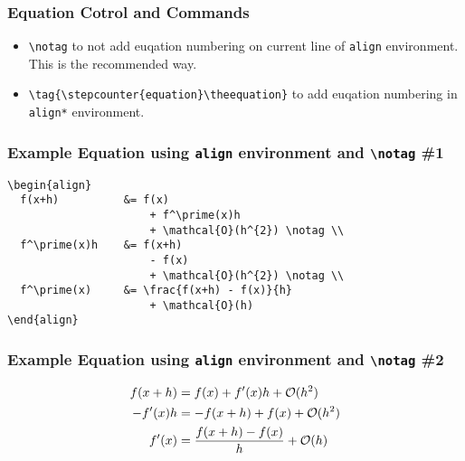 \documentclass{beamer}
\begin{document}
\begin{frame}[fragile]
  \frametitle{Equation Cotrol and Commands}
  \begin{itemize}
    \item \verb|\notag| to not add euqation numbering on current line of \texttt{align} environment. This is the recommended way.
    \item \verb|\tag{\stepcounter{equation}\theequation}| to add euqation numbering in \texttt{align*} environment.
  \end{itemize}
\end{frame}

\begin{frame}[fragile]
  \frametitle{Example Equation using \texttt{align} environment and \texttt{\textbackslash notag} \#1}

  \begin{verbatim}
\begin{align}
  f(x+h)          &= f(x)
                      + f^\prime(x)h
                      + \mathcal{O}(h^{2}) \notag \\
  f^\prime(x)h    &= f(x+h)
                      - f(x)
                      + \mathcal{O}(h^{2}) \notag \\
  f^\prime(x)     &= \frac{f(x+h) - f(x)}{h}
                      + \mathcal{O}(h)
\end{align}
  \end{verbatim}
\end{frame}

\begin{frame}[fragile]
  \frametitle{Example Equation using \texttt{align} environment and \texttt{\textbackslash notag} \#2}

\begin{align}
  f(x+h)          &= f(x)
                      + f^\prime(x)h
                      + \mathcal{O}(h^{2}) \notag \\
  -f^\prime(x)h    &= -f(x+h)
                      + f(x)
                      + \mathcal{O}(h^{2}) \notag \\
  f^\prime(x)     &= \frac{f(x+h) - f(x)}{h}
                      + \mathcal{O}(h)
  \end{align}
\end{frame}
\end{document}
